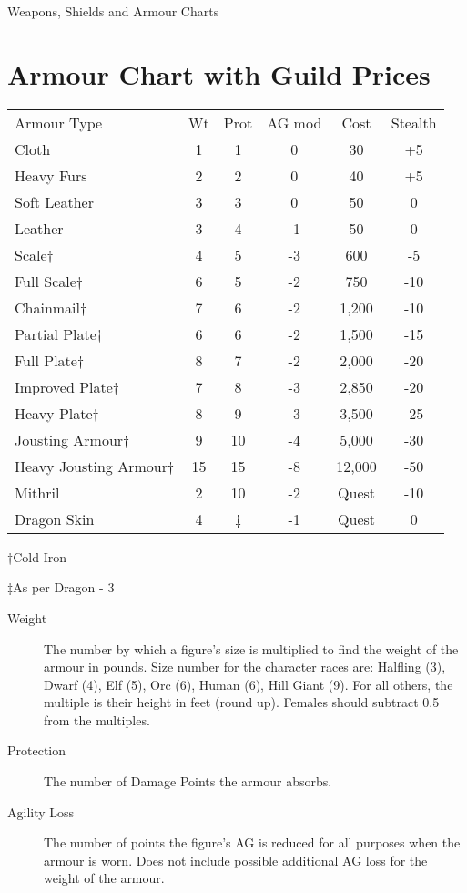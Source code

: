 \begin{Tables}{Weapons, Shields and Armour Charts}
\section{Armour Chart with Guild Prices}

 
\begin{tabularx}{\linewidth}{Xccccc}
Armour Type		& Wt	& Prot	& AG mod& Cost	& Stealth \\ 
Cloth			& 1	& 1	& 0	& 30	& +5 \\
Heavy Furs		& 2	& 2	& 0	& 40	& +5 \\
Soft Leather		& 3	& 3	& 0	& 50	& 0 \\
Leather			& 3	& 4	& -1	& 50	& 0 \\
Scale†			& 4	& 5	& -3	& 600	& -5 \\
Full Scale†		& 6	& 5	& -2	& 750	& -10 \\
Chainmail†		& 7	& 6	& -2	& 1,200	& -10 \\
Partial Plate†		& 6	& 6	& -2	& 1,500	& -15 \\
Full Plate†		& 8	& 7	& -2	& 2,000	& -20 \\
Improved Plate†		& 7	& 8	& -3	& 2,850	& -20 \\
Heavy Plate†		& 8	& 9	& -3	& 3,500	& -25 \\
Jousting Armour†	& 9	& 10	& -4	& 5,000	& -30 \\
Heavy Jousting Armour†	& 15	& 15	& -8	& 12,000& -50 \\
Mithril			& 2	& 10	& -2	& Quest	& -10 \\
Dragon Skin		& 4	& ‡	& -1	& Quest	& 0 \\
\end{tabularx}

†Cold Iron  

‡As per Dragon - 3 

\begin{description}
\item[Weight] The number by which a figure’s size is multiplied to
  find the weight of the armour in pounds. Size number for the
  character races are: Halfling (3), Dwarf (4), Elf (5), Orc (6),
  Human (6), Hill Giant (9). For all others, the multiple is their
  height in feet (round up).  Females should subtract 0.5 from the
  multiples.

\item[Protection] The number of Damage Points the armour absorbs.

\item[Agility Loss] The number of points the figure’s AG is reduced
  for all purposes when the armour is worn. Does not include possible
  additional AG loss for the weight of the armour.


\end{description}
\end{Tables}
